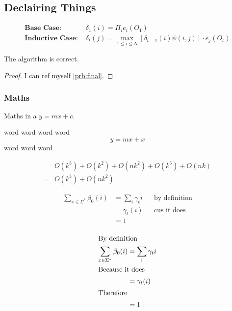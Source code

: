 \subsection{Declairing Things}

\begin{align*}
    \textbf{Base Case: } &\delta_1(i) = \Pi_i e_i(O_1)\\
    \textbf{Inductive Case: } &\delta_t(j) = \max_{1\leq i \leq N}[\delta_{t-1}(i)\psi(i,j)]\cdot e_j(O_t)
\end{align*}


\begin{lemma}
    \label{prb:final}
    The algorithm is correct. 
\end{lemma}
\begin{proof}
I can ref myself \cref{prb:final}.
\end{proof}

  



\subsubsection*{Maths}
Maths in a $y=mx+c$.

word word word word 
\[y=mx+x\]
word word word

\begin{align*}
&O(k^3) + O(k^2) + O(nk^2) + O(k^3) + O(nk)\\
=& O(k^3) + O(nk^2)
\end{align*}

\begin{align*}
    \sum_{x \in \Sigma^*} \beta_0(i) &= \sum_{i} \gamma_t{i} && \text{by definition}\\
    &= \gamma_t(i) && \text{cus it does}\\
    & = 1\\
\end{align*}

\begin{align*}
    \shortintertext{By definition}
    \sum_{x \in \Sigma^*} \beta_0(i) &= \sum_{i} \gamma_t{i}\\
    \shortintertext{Because it does}
    &= \gamma_t(i)\\
    \shortintertext{Therefore}
    & = 1\\
\end{align*}


